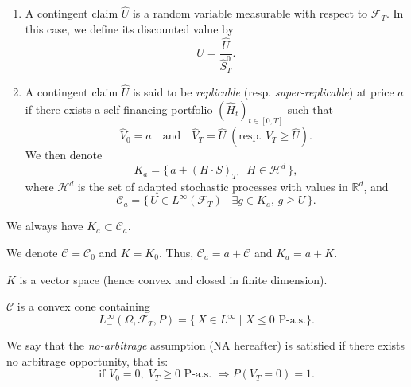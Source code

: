 \begin{definition}
\begin{enumerate}[label=(\alph*)]
\item A contingent claim $\hat U$ is a random variable measurable with respect to $\mathcal{F}_T$.  
In this case, we define its discounted value by
\begin{equation}
U = \frac{\hat U}{\hat S_T^0}.
\end{equation}

\item A contingent claim $\hat U$ is said to be \emph{replicable} (resp. \emph{super-replicable}) at price $a$ if there exists a self-financing portfolio $(\hat H_t)_{t\in[0,T]}$ such that
\begin{equation}
\hat V_0 = a \quad \text{and} \quad \hat V_T = \hat U \; (\text{resp. } \hat V_T \ge \hat U).
\end{equation}
We then denote
\begin{equation}
K_a = \bigl\{\, a + (H \cdot S)_T \;|\; H \in \mathcal{H}^d \,\bigr\},
\end{equation}
where $\mathcal{H}^d$ is the set of adapted stochastic processes with values in $\mathbb{R}^d$, and
\begin{equation}
\mathcal{C}_a = \bigl\{\, U \in L^\infty(\mathcal{F}_T) \;|\; \exists g \in K_a,\, g \ge U \,\bigr\}.
\end{equation}
\end{enumerate}
We always have $K_a \subset \mathcal{C}_a$.
\end{definition}

\begin{remarks}
\item[(a)] We denote $\mathcal{C} = \mathcal{C}_0$ and $K = K_0$. Thus, $\mathcal{C}_a = a + \mathcal{C}$ and $K_a = a + K$.

\item[(b)] $K$ is a vector space (hence convex and closed in finite dimension).

\item[(c)] $\mathcal{C}$ is a convex cone containing
\[
L_-^\infty(\Omega, \mathcal{F}_T, P) = \{\, X \in L^\infty \mid X \le 0 \text{ P-a.s.} \}.
\]
\end{remarks}

\begin{definition}
We say that the \emph{no-arbitrage} assumption (NA hereafter) is satisfied if there exists no arbitrage opportunity, that is:
\begin{equation}
\text{if } V_0 = 0, \; V_T \ge 0 \text{ P-a.s. } \Rightarrow P(V_T = 0) = 1.
\end{equation}
\end{definition}

